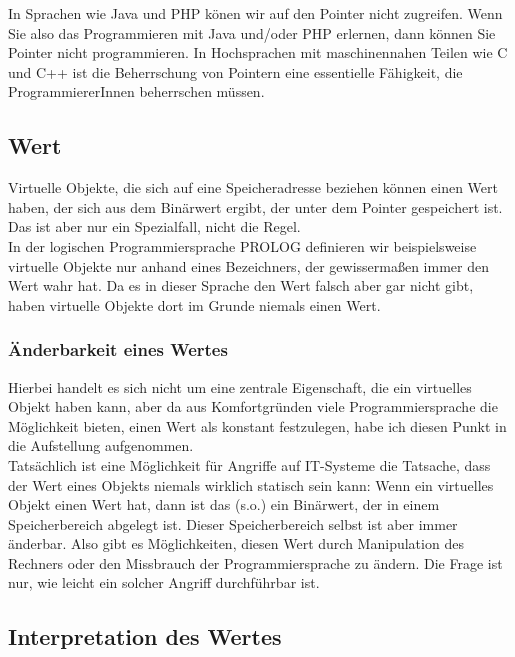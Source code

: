 In Sprachen wie Java und PHP könen wir auf den Pointer nicht zugreifen. Wenn Sie also das Programmieren mit Java und/oder PHP erlernen, dann können Sie Pointer nicht programmieren. In Hochsprachen mit maschinennahen Teilen wie C und C++ ist die Beherrschung von Pointern eine essentielle Fähigkeit, die ProgrammiererInnen beherrschen müssen.

\subsection{Wert}

Virtuelle Objekte, die sich auf eine Speicheradresse beziehen können einen Wert haben, der sich aus dem Binärwert ergibt, der unter dem Pointer gespeichert ist. Das ist aber nur ein Spezialfall, nicht die Regel. \\

In der logischen Programmiersprache PROLOG definieren wir beispielsweise virtuelle Objekte nur anhand eines Bezeichners, der gewissermaßen immer den Wert wahr hat. Da es in dieser Sprache den Wert falsch aber gar nicht gibt, haben virtuelle Objekte dort im Grunde niemals einen Wert.

\subsubsection{Änderbarkeit eines Wertes}

Hierbei handelt es sich nicht um eine zentrale Eigenschaft, die ein virtuelles Objekt haben kann, aber da aus Komfortgründen viele Programmiersprache die Möglichkeit bieten, einen Wert als konstant festzulegen, habe ich diesen Punkt in die Aufstellung aufgenommen.\\

Tatsächlich ist eine Möglichkeit für Angriffe auf IT-Systeme die Tatsache, dass der Wert eines Objekts niemals wirklich statisch sein kann: Wenn ein virtuelles Objekt einen Wert hat, dann ist das (s.o.) ein Binärwert, der in einem Speicherbereich abgelegt ist. Dieser Speicherbereich selbst ist aber immer änderbar. Also gibt es Möglichkeiten, diesen Wert durch Manipulation des Rechners oder den Missbrauch der Programmiersprache zu ändern. Die Frage ist nur, wie leicht ein solcher Angriff durchführbar ist.

\subsection{Interpretation des Wertes}

